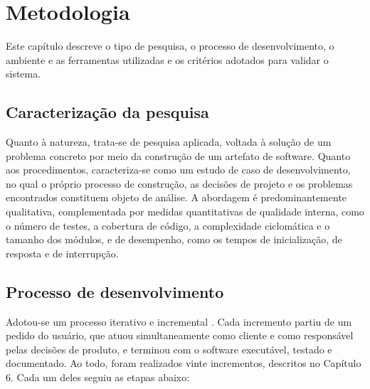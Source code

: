 \chapter{Metodologia}

Este capítulo descreve o tipo de pesquisa, o processo de desenvolvimento, o ambiente e as ferramentas
utilizadas e os critérios adotados para validar o sistema.

\section{Caracterização da pesquisa}

Quanto à natureza, trata-se de pesquisa aplicada, voltada à solução de um problema concreto por meio
da construção de um artefato de software. Quanto aos procedimentos, caracteriza-se como um estudo de
caso de desenvolvimento, no qual o próprio processo de construção, as decisões de projeto e os
problemas encontrados constituem objeto de análise. A abordagem é predominantemente qualitativa,
complementada por medidas quantitativas de qualidade interna, como o número de testes, a cobertura de
código, a complexidade ciclomática e o tamanho dos módulos, e de desempenho, como os tempos de
inicialização, de resposta e de interrupção.

\section{Processo de desenvolvimento}

Adotou-se um processo iterativo e incremental \cite{larman2003}. Cada incremento partiu de um pedido
do usuário, que atuou simultaneamente como cliente e como responsável pelas decisões de produto, e
terminou com o software executável, testado e documentado. Ao todo, foram realizados vinte
incrementos, descritos no Capítulo 6. Cada um deles seguiu as etapas abaixo:

